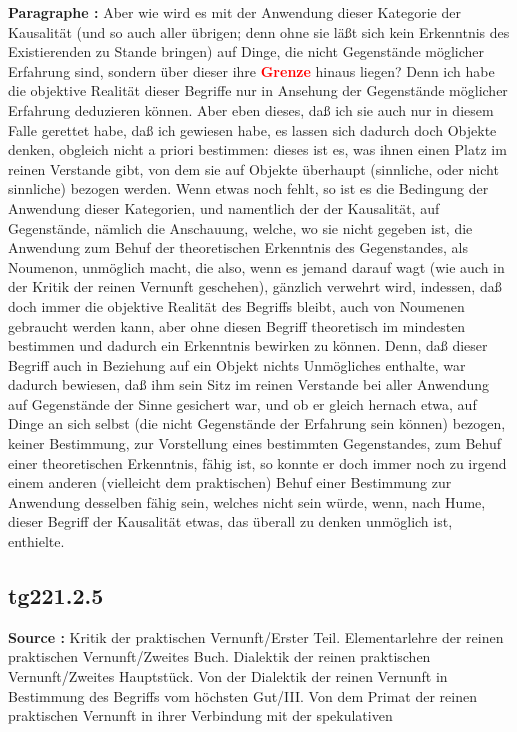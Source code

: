 \documentclass[a4paper,12pt,twoside]{book}
\newcommand{\match}[1]{\textcolor{red}{\textbf{#1}}}
\begin{document}
	\noindent\textbf{Paragraphe : }Aber wie wird es mit der Anwendung dieser Kategorie der Kausalität (und so auch aller übrigen; denn ohne sie läßt sich kein Erkenntnis des Existierenden zu Stande bringen) auf Dinge, die nicht Gegenstände möglicher Erfahrung sind, sondern über dieser ihre \match{Grenze} hinaus liegen? Denn ich habe die objektive Realität dieser Begriffe nur in Ansehung  der Gegenstände möglicher Erfahrung deduzieren können. Aber eben dieses, daß ich sie auch nur in diesem Falle gerettet habe, daß ich gewiesen habe, es lassen sich dadurch doch Objekte denken, obgleich nicht a priori bestimmen: dieses ist es, was ihnen einen Platz im reinen Verstande gibt, von dem sie auf Objekte überhaupt (sinnliche, oder nicht sinnliche) bezogen werden. Wenn etwas noch fehlt, so ist es die Bedingung der Anwendung dieser Kategorien, und namentlich der der Kausalität, auf Gegenstände, nämlich die Anschauung, welche, wo sie nicht gegeben ist, die Anwendung zum Behuf der theoretischen Erkenntnis des Gegenstandes, als Noumenon, unmöglich macht, die also, wenn es jemand darauf wagt (wie auch in der Kritik der reinen Vernunft geschehen), gänzlich verwehrt wird, indessen, daß doch immer die objektive Realität des Begriffs bleibt, auch von Noumenen gebraucht werden kann, aber ohne diesen Begriff theoretisch im mindesten bestimmen und dadurch ein Erkenntnis bewirken zu können. Denn, daß dieser Begriff auch in Beziehung auf ein Objekt nichts Unmögliches enthalte, war dadurch bewiesen, daß ihm sein Sitz im reinen Verstande bei aller Anwendung auf Gegenstände der Sinne gesichert war, und ob er gleich hernach etwa, auf Dinge an sich selbst (die nicht Gegenstände der Erfahrung sein können) bezogen, keiner Bestimmung, zur Vorstellung eines bestimmten Gegenstandes, zum Behuf einer theoretischen Erkenntnis, fähig ist, so konnte er doch immer noch zu irgend einem anderen (vielleicht dem praktischen) Behuf einer Bestimmung zur Anwendung desselben fähig sein, welches nicht sein würde, wenn, nach Hume, dieser Begriff der Kausalität etwas, das überall zu denken unmöglich ist, enthielte. 
	
	\subsection*{tg221.2.5} 
	\textbf{Source : }Kritik der praktischen Vernunft/Erster Teil. Elementarlehre der reinen praktischen Vernunft/Zweites Buch. Dialektik der reinen praktischen Vernunft/Zweites Hauptstück. Von der Dialektik der reinen Vernunft in Bestimmung des Begriffs vom höchsten Gut/III. Von dem Primat der reinen praktischen Vernunft in ihrer Verbindung mit der spekulativen\\  
	
\end{document}
